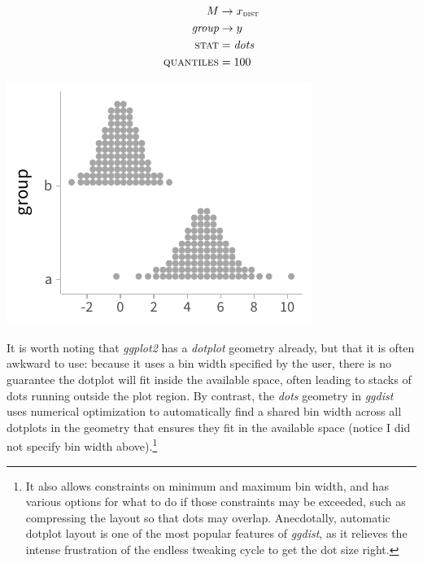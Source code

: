 \documentclass[journal]{vgtc}                     %
\begin{document}
\noindent
\begin{minipage}{.5\columnwidth}

\begin{align*}
M &\rightarrow x_\textsc{dist}\\
\textit{group} &\rightarrow y\\
\textsc{stat} &= \mathit{dots}\\
\textsc{quantiles} &= 100
\end{align*}
\end{minipage}%
  \begin{minipage}{.4\columnwidth}
    \centering
    \includegraphics[width=1.2\columnwidth]{figs/3-dots_two.pdf}
  \end{minipage}
\hfill\break

It is worth noting that \textit{ggplot2} has a \textit{dotplot} geometry already, but that it is often awkward to use: because it uses a bin width specified by the user, there is no guarantee the dotplot will fit inside the available space, often leading to stacks of dots running outside the plot region. By contrast, the \textit{dots} geometry in \textit{ggdist} uses numerical optimization to automatically find a shared bin width across all dotplots in the geometry that ensures they fit in the available space (notice I did not specify bin width above).\footnote{It also allows constraints on minimum and maximum bin width, and has various options for what to do if those constraints may be exceeded, such as compressing the layout so that dots may overlap. Anecdotally, automatic dotplot layout is one of the most popular features of \textit{ggdist}, as it relieves the intense frustration of the endless tweaking cycle to get the dot size right.}
\end{document}

